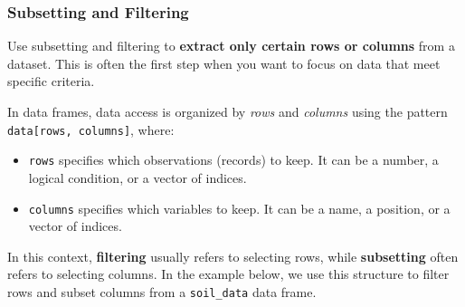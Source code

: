 \documentclass[
  10pt,
  b5paper,
  oneside]{book}
\begin{document}
\subsubsection{Subsetting and Filtering}\label{R-data-subset}

Use subsetting and filtering to \textbf{extract only certain rows or columns} from a dataset. This is often the first step when you want to focus on data that meet specific criteria.

In data frames, data access is organized by \emph{rows} and \emph{columns} using the pattern \texttt{data{[}rows,\ columns{]}}, where:

\begin{itemize}
\item
  \texttt{rows} specifies which observations (records) to keep. It can be a number, a logical condition, or a vector of indices.
\item
  \texttt{columns} specifies which variables to keep. It can be a name, a position, or a vector of indices.
\end{itemize}

In this context, \textbf{filtering} usually refers to selecting rows, while \textbf{subsetting} often refers to selecting columns. In the example below, we use this structure to filter rows and subset columns from a \texttt{soil\_data} data frame.
\end{document}
